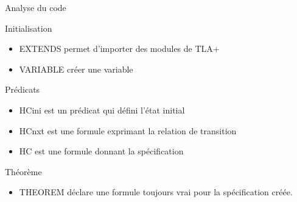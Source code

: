 \documentclass{beamer}
\begin{document}
\begin{frame}{Analyse du code}
	\begin{block}{Initialisation}
		\begin{itemize}
			\item EXTENDS permet d'importer des modules de TLA+
			\item VARIABLE créer une variable
		\end{itemize}	
	\end{block}		
	\begin{block}{Prédicats}
		\begin{itemize}
			\item HCini est un prédicat qui défini l'état initial
			\item HCnxt est une formule exprimant la relation de transition
			\item HC est une formule donnant la spécification
		\end{itemize}	
	\end{block}
	\begin{block}{Théorème}
		\begin{itemize}
			\item THEOREM déclare une formule toujours vrai pour la spécification créée.
		\end{itemize}	
	\end{block}			
\end{frame}
\end{document}
